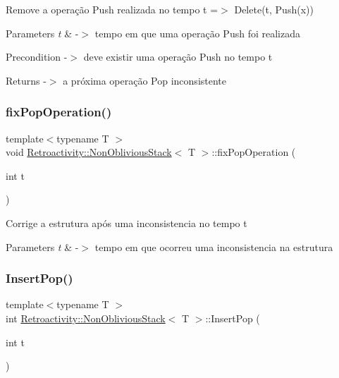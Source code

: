 Remove a operação Push realizada no tempo t =$>$ Delete(t, Push(x))


\begin{DoxyParams}{Parameters}
{\em t} & -\/$>$ tempo em que uma operação Push foi realizada \\
\hline
\end{DoxyParams}
\begin{DoxyPrecond}{Precondition}
-\/$>$ deve existir uma operação Push no tempo t 
\end{DoxyPrecond}
\begin{DoxyReturn}{Returns}
-\/$>$ a próxima operação Pop inconsistente 
\end{DoxyReturn}
\mbox{\label{classRetroactivity_1_1NonObliviousStack_aa7710e91e99204175b1bf8f15b580f13}} 
\subsubsection{\texorpdfstring{fix\+Pop\+Operation()}{fixPopOperation()}}
{\footnotesize\ttfamily template$<$typename T $>$ \\
void \hyperlink{classRetroactivity_1_1NonObliviousStack}{Retroactivity\+::\+Non\+Oblivious\+Stack}$<$ T $>$\+::fix\+Pop\+Operation (\begin{DoxyParamCaption}\item[{int}]{t }\end{DoxyParamCaption})}

Corrige a estrutura após uma inconsistencia no tempo t


\begin{DoxyParams}{Parameters}
{\em t} & -\/$>$ tempo em que ocorreu uma inconsistencia na estrutura \\
\hline
\end{DoxyParams}
\mbox{\label{classRetroactivity_1_1NonObliviousStack_ae6efaa3ffb84206f0ffc8171df994cc9}} 
\subsubsection{\texorpdfstring{Insert\+Pop()}{InsertPop()}}
{\footnotesize\ttfamily template$<$typename T $>$ \\
int \hyperlink{classRetroactivity_1_1NonObliviousStack}{Retroactivity\+::\+Non\+Oblivious\+Stack}$<$ T $>$\+::Insert\+Pop (\begin{DoxyParamCaption}\item[{int}]{t }\end{DoxyParamCaption})}

